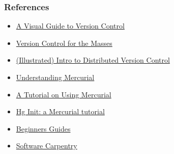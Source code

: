 \documentclass[14pt,compress]{beamer}
\begin{document}
\begin{frame}
  \frametitle{References}
  \begin{itemize}
  \item \href{http://betterexplained.com/articles/a-visual-guide-to-version-control/}{A Visual Guide to Version Control}
  \item \href{http://karlagius.com/2009/01/09/version-control-for-the-masses/}{Version Control for the Masses}
  \item \href{http://betterexplained.com/articles/intro-to-distributed-version-control-illustrated/}{(Illustrated) Intro to Distributed Version Control}
  \item \href{http://mercurial.selenic.com/wiki/UnderstandingMercurial}{Understanding Mercurial}
  \item \href{http://mercurial.selenic.com/wiki/Tutorial}{A Tutorial on Using Mercurial}
  \item \href{http://hginit.com/}{Hg Init: a Mercurial tutorial}
  \item \href{http://mercurial.selenic.com/wiki/BeginnersGuides}{Beginners Guides}
  \item \href{http://software-carpentry.org/4_0/vc/}{Software Carpentry}
  \end{itemize}
\end{frame}
\end{document}

